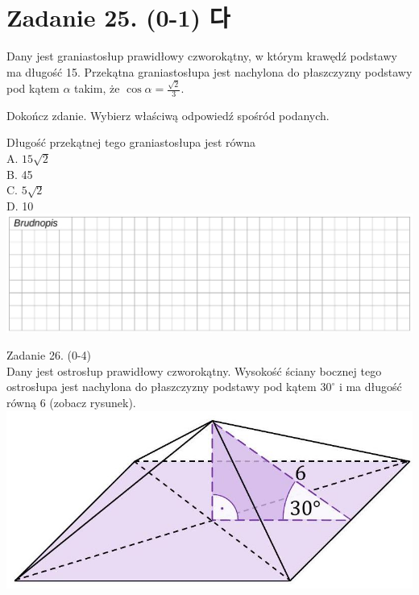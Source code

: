 \documentclass[10pt]{article}
\begin{document}
\section*{Zadanie 25. (0-1) 다}
Dany jest graniastosłup prawidłowy czworokątny, w którym krawędź podstawy ma długość 15. Przekątna graniastosłupa jest nachylona do płaszczyzny podstawy pod kątem \(\alpha\) takim, że \(\cos \alpha=\frac{\sqrt{2}}{3}\).

Dokończ zdanie. Wybierz właściwą odpowiedź spośród podanych.

Długość przekątnej tego graniastosłupa jest równa\\
A. \(15 \sqrt{2}\)\\
B. 45\\
C. \(5 \sqrt{2}\)\\
D. 10\\
\includegraphics[max width=\textwidth, center]{2024_11_21_51cb67544fb9b029f01cg-21(6)}

Zadanie 26. (0-4)\\
Dany jest ostrosłup prawidłowy czworokątny. Wysokość ściany bocznej tego ostrosłupa jest nachylona do płaszczyzny podstawy pod kątem \(30^{\circ}\) i ma długość równą 6 (zobacz rysunek).\\
\includegraphics[max width=\textwidth, center]{2024_11_21_51cb67544fb9b029f01cg-22}
\end{document}
